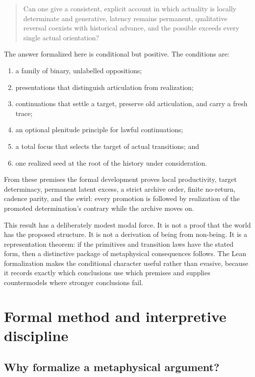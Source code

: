 \documentclass[11pt]{article}
\theoremstyle{definition}
\theoremstyle{remark}
\begin{document}
\begin{quote}
Can one give a consistent, explicit account in which actuality is locally
determinate and generative, latency remains permanent, qualitative reversal
coexists with historical advance, and the possible exceeds every single
actual orientation?
\end{quote}

The answer formalized here is conditional but positive. The conditions are:

\begin{enumerate}[label=(\roman*)]
  \item a family of binary, unlabelled oppositions;
  \item presentations that distinguish articulation from realization;
  \item continuations that settle a target, preserve old articulation, and
        carry a fresh trace;
  \item an optional plenitude principle for lawful continuations;
  \item a total focus that selects the target of actual transitions; and
  \item one realized seed at the root of the history under consideration.
\end{enumerate}

From these premises the formal development proves local productivity,
target determinacy, permanent latent excess, a strict archive order, finite
no-return, cadence parity, and the swirl: every promotion is followed by
realization of the promoted determination's contrary while the archive moves
on.

This result has a deliberately modest modal force. It is not a proof that the
world has the proposed structure. It is not a derivation of being from
non-being. It is a representation theorem: if the primitives and transition
laws have the stated form, then a distinctive package of metaphysical
consequences follows. The Lean formalization makes the conditional character
useful rather than evasive, because it records exactly which conclusions use
which premises and supplies countermodels where stronger conclusions fail.

\section{Formal method and interpretive discipline}

\subsection{Why formalize a metaphysical argument?}
\end{document}
